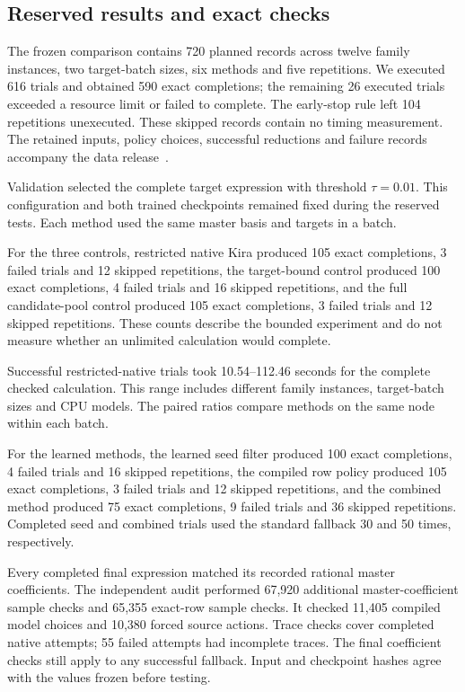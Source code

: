 \subsection{Reserved results and exact checks}

\label{sec:acceleration-results}

The frozen comparison contains 720 planned records across twelve family instances, two target-batch sizes, six methods and five repetitions. We executed 616 trials and obtained 590 exact completions; the remaining 26 executed trials exceeded a resource limit or failed to complete. The early-stop rule left 104 repetitions unexecuted. These skipped records contain no timing measurement. The retained inputs, policy choices, successful reductions and failure records accompany the data release~\cite{KiraNativeAccelerationData}.

Validation selected the complete target expression with threshold $\tau=0.01$. This configuration and both trained checkpoints remained fixed during the reserved tests. Each method used the same master basis and targets in a batch.

For the three controls, restricted native Kira produced 105 exact completions, 3 failed trials and 12 skipped repetitions, the target-bound control produced 100 exact completions, 4 failed trials and 16 skipped repetitions, and the full candidate-pool control produced 105 exact completions, 3 failed trials and 12 skipped repetitions. These counts describe the bounded experiment and do not measure whether an unlimited calculation would complete.

Successful restricted-native trials took 10.54--112.46 seconds for the complete checked calculation. This range includes different family instances, target-batch sizes and CPU models. The paired ratios compare methods on the same node within each batch.

For the learned methods, the learned seed filter produced 100 exact completions, 4 failed trials and 16 skipped repetitions, the compiled row policy produced 105 exact completions, 3 failed trials and 12 skipped repetitions, and the combined method produced 75 exact completions, 9 failed trials and 36 skipped repetitions. Completed seed and combined trials used the standard fallback 30 and 50 times, respectively.

Every completed final expression matched its recorded rational master coefficients. The independent audit performed 67,920 additional master-coefficient sample checks and 65,355 exact-row sample checks. It checked 11,405 compiled model choices and 10,380 forced source actions. Trace checks cover completed native attempts; 55 failed attempts had incomplete traces. The final coefficient checks still apply to any successful fallback. Input and checkpoint hashes agree with the values frozen before testing.

